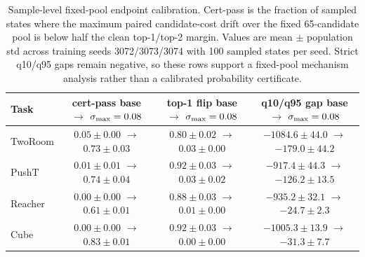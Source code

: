 \begin{table}[H]
\centering
\caption{Sample-level fixed-pool endpoint calibration. Cert-pass is the fraction of sampled states where the maximum paired candidate-cost drift over the fixed 65-candidate pool is below half the clean top-1/top-2 margin. Values are mean $\pm$ population std across training seeds 3072/3073/3074 with 100 sampled states per seed. Strict q10/q95 gaps remain negative, so these rows support a fixed-pool mechanism analysis rather than a calibrated probability certificate.}
\label{tab:sample-level-certificate-endpoint}
\small
\setlength{\tabcolsep}{3.5pt}
\begin{tabular}{lccc}
\toprule
Task & cert-pass base $\to$ $\sigma_{\max}=0.08$ & top-1 flip base $\to$ $\sigma_{\max}=0.08$ & q10/q95 gap base $\to$ $\sigma_{\max}=0.08$ \\
\midrule
TwoRoom & $0.05 \pm 0.00$ $\to$ $0.73 \pm 0.03$ & $0.80 \pm 0.02$ $\to$ $0.03 \pm 0.00$ & $-1084.6 \pm 44.0$ $\to$ $-179.0 \pm 44.2$ \\
PushT & $0.01 \pm 0.01$ $\to$ $0.74 \pm 0.04$ & $0.92 \pm 0.03$ $\to$ $0.03 \pm 0.02$ & $-917.4 \pm 44.3$ $\to$ $-126.2 \pm 13.5$ \\
Reacher & $0.00 \pm 0.00$ $\to$ $0.61 \pm 0.01$ & $0.88 \pm 0.03$ $\to$ $0.01 \pm 0.00$ & $-935.2 \pm 32.1$ $\to$ $-24.7 \pm 2.3$ \\
Cube & $0.00 \pm 0.00$ $\to$ $0.83 \pm 0.01$ & $0.92 \pm 0.03$ $\to$ $0.00 \pm 0.00$ & $-1005.3 \pm 13.9$ $\to$ $-31.3 \pm 7.7$ \\
\bottomrule
\end{tabular}
\end{table}
